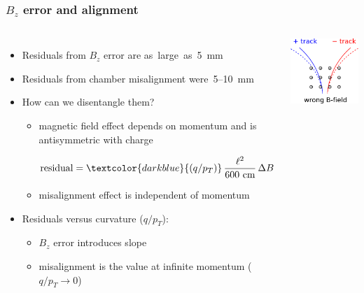\documentclass[compress]{beamer}
\begin{document}
\begin{frame}
\frametitle{$B_z$ error and alignment}

\begin{columns}

\begin{itemize}\setlength{\itemsep}{0.35 cm}
\item Residuals from $B_z$ error are \mbox{as large as 5~mm\hspace{-1 cm}}
\item Residuals from chamber misalignment \mbox{were 5--10~mm\hspace{-3 cm}}
\item How can we disentangle them?
\begin{itemize}\setlength{\itemsep}{0.2 cm}
\item magnetic field effect depends on momentum and is antisymmetric with charge

$\displaystyle \mbox{residual} = \textcolor{darkblue}{(q/p_T)} \, \frac{\ell^2}{\mbox{600 cm}} \, \Delta B$

\item misalignment effect is independent of momentum
\end{itemize}
\item Residuals versus curvature ($q/p_T$):
\begin{itemize}
\item $B_z$ error introduces \mbox{slope\hspace{-1 cm}}
\item misalignment is the value at infinite momentum ($q/p_T \to 0$)
\end{itemize}
\end{itemize}

\hfill \includegraphics[width=0.6\linewidth]{antisymmetric_bfield.png}


\end{columns}
\end{frame}
\end{document}
